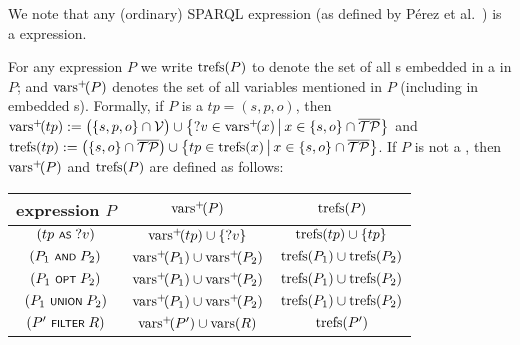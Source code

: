 \begin{note}
		We note that any
	(ordinary) SPARQL expression (as defined by P\'{e}rez et al.~\cite{Perez09:SemanticsAndComplexityOfSPARQL}) is a {\SPARQLplus} expression.
\end{note}

\noindent
For any {\SPARQLplus} expression $P$ we write $\mathrm{trefs}(P)$ to denote the set of all {\TPplus}s embedded in a {\TPplus} in $P$; and $\mathrm{vars}^+\!(P)$ denotes the set of all variables mentioned in $P$ (including in embedded {\TPplus}s). Formally, if $P$ is a {\TPplus} $tp \!=\! (s,p,o)$,
then $\mathrm{vars}^+\!(tp) := \bigl( \lbrace s,p,o \rbrace \cap \mathcal{V} \bigr) \cup \big\lbrace ?v \in \mathrm{vars}^+\!(x) \,\big|\, x \in \lbrace s,o \rbrace \cap \overline{\mathcal{TP}} \big\rbrace$
and $\mathrm{trefs}(tp) := \bigl( \lbrace s,o \rbrace \cap \overline{\mathcal{TP}} \bigr) \cup \big\lbrace tp \in \mathrm{trefs}(x) \,\big|\, x \in \lbrace s,o \rbrace \cap \overline{\mathcal{TP}} \big\rbrace$.
If $P$ is not a {\TPplus}, then $\mathrm{vars}^+\!(P)$ and $\mathrm{trefs}(P)$ are defined as follows:
	\par \vspace{1pt}
	\parbox{0.95\linewidth}{\centering
		\begin{tabular}{|c||c|c|} \hline
			{\SPARQLplus} expression $P$ &
			$\mathrm{vars}^+\!(P)$ &
			$\mathrm{trefs}(P)$
			\\ \hline
			\hline
			$(tp \text{ \normalfont\scriptsize\textsf{AS} } ?v)$ &
			$\mathrm{vars}^+\!(tp) \cup \lbrace ?v \rbrace$ &
			$\mathrm{trefs}(tp) \cup \lbrace tp \rbrace$
			\\ \hline
			$(P_1 \text{ \normalfont\scriptsize\textsf{AND} } P_2)$ &
			$\mathrm{vars}^+\!(P_1) \cup \mathrm{vars}^+\!(P_2)$ &
			$\mathrm{trefs}(P_1) \cup \mathrm{trefs}(P_2)$
			\\ \hline
			$(P_1 \text{ \normalfont\scriptsize\textsf{OPT} } P_2)$ &
			$\mathrm{vars}^+\!(P_1) \cup \mathrm{vars}^+\!(P_2)$ &
			$\mathrm{trefs}(P_1) \cup \mathrm{trefs}(P_2)$
			\\ \hline
			$(P_1 \text{ \normalfont\scriptsize\textsf{UNION} } P_2)$ &
			$\mathrm{vars}^+\!(P_1) \cup \mathrm{vars}^+\!(P_2)$ &
			$\mathrm{trefs}(P_1) \cup \mathrm{trefs}(P_2)$
			\\ \hline
			$(P' \text{ \normalfont\scriptsize\textsf{FILTER} } R)$ &
			$\mathrm{vars}^+\!(P') \cup \mathrm{vars}(R)$ &
			$\mathrm{trefs}(P')$
			\\ \hline
		\end{tabular}
	}
	\par


